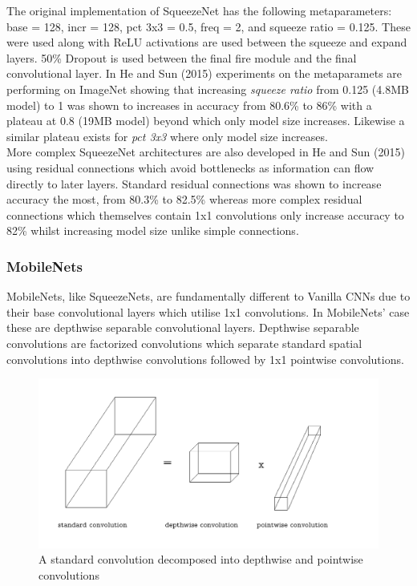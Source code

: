 \documentclass{article}
\begin{document}
The original implementation of SqueezeNet has the following metaparameters: base = 128, incr = 128, pct 3x3 = 0.5, freq = 2, and squeeze ratio = 0.125. These were used along with ReLU activations are used between the squeeze and expand layers. 50\% Dropout is used between the final fire module and the final convolutional layer. In He and Sun (2015) experiments on the metaparamets are performing on ImageNet showing that increasing \emph{squeeze ratio} from 0.125 (4.8MB model) to 1 was shown to increases in accuracy from 80.6\% to 86\% with a plateau at 0.8 (19MB model) beyond which only model size increases. Likewise a similar plateau exists for \emph{pct 3x3} where only model size increases.\\

More complex SqueezeNet architectures are also developed in He and Sun (2015) using residual connections which avoid bottlenecks as information can flow directly to later layers. Standard residual connections was shown to increase accuracy the most, from 80.3\% to 82.5\% whereas more complex residual connections which themselves contain 1x1 convolutions only increase accuracy to 82\% whilst increasing model size unlike simple connections.\\

\subsubsection{MobileNets}

MobileNets, like SqueezeNets, are fundamentally different to Vanilla CNNs due to their base convolutional layers which utilise 1x1 convolutions. In MobileNets' case these are depthwise separable convolutional layers. Depthwise separable convolutions are factorized convolutions which separate standard spatial convolutions into depthwise convolutions followed by 1x1 pointwise convolutions.\\

\begin{figure}[!b]
  \includegraphics[width=\linewidth]{separableconv.pdf}
  \caption{A standard convolution decomposed into depthwise and pointwise convolutions}
  \label{fig:dwconvolution}
\end{figure}
\end{document}
